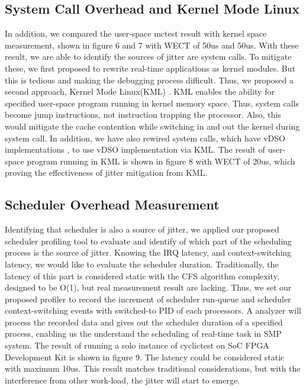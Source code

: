 \documentclass[conference]{IEEEtran}
\begin{document}
\subsection{System Call Overhead and Kernel Mode Linux}

    In addition, we compared the user-space mctest result with kernel space measurement, shown in figure 6 and 7 with
    WECT of 50us and 50us. With these result, we are able to identify the sources of jitter are system calls. To
    mitigate these, we first proposed to rewrite real-time applications as kernel modules. But this is tedious and
    making the debugging process difficult. Thus, we proposed a second approach, Kernel Mode Linux(KML) \cite{KML}
    \cite{KMLConf}. KML enables the ability for specified user-space program running in kernel memory space. Thus,
    system calls become jump instructions, not instruction trapping the processor. Also, this would mitigate the cache
    contention while switching in and out the kernel during system call. In addition, we have also rewired system calls,
    which have vDSO implementations \cite{vDSO}, to use vDSO implementation via KML. The result of user-space program
    running in KML is shown in figure 8 with WECT of 20us, which proving the effectiveness of jitter mitigation from
    KML.
    
\subsection{Scheduler Overhead Measurement}
    
    Identifying that scheduler is also a source of jitter, we applied our proposed scheduler profiling tool to evaluate
    and identify of which part of the scheduling process is the source of jitter. Knowing the IRQ latency, and
    context-switching latency, we would like to evaluate the scheduler duration. Traditionally, the latency of this part
    is considered static with the CFS algorithm complexity, designed to be O(1), but real measurement result are
    lacking. Thus, we set our proposed profiler to record the increment of scheduler run-queue and scheduler
    context-switching events with switched-to PID of each processors. A analyzer will process the recorded data and
    gives out the scheduler duration of a specified process, enabling us the understand the scheduling of real-time task
    in SMP system. The result of running a solo instance of cyclictest on SoC FPGA Development Kit is shown in figure 9.
    The latency could be considered static with maximum 10us. This result matches traditional considerations, but with
    the interference from other work-load, the jitter will start to emerge.
\end{document}
